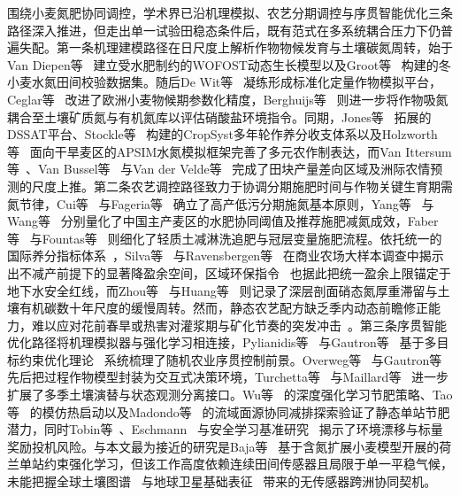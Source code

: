 \documentclass[11pt,a4paper]{article}
\begin{document}
围绕小麦氮肥协同调控，学术界已沿机理模拟、农艺分期调控与序贯智能优化三条路径深入推进，但走出单一试验田稳态条件后，既有范式在多系统耦合压力下仍普遍失配。第一条机理建模路径在日尺度上解析作物物候发育与土壤碳氮周转，始于Van Diepen等~\citep{vandiepen1989} 建立受水肥制约的WOFOST动态生长模型以及Groot等~\citep{groot1991} 构建的冬小麦水氮田间校验数据集。随后De Wit等~\citep{dewit2019} 凝练形成标准化定量作物模拟平台，Ceglar等~\citep{ceglar2019} 改进了欧洲小麦物候期参数化精度，Berghuijs等~\citep{berghuijs2024} 则进一步将作物吸氮耦合至土壤矿质氮与有机氮库以评估硝酸盐环境指令。同期，Jones等~\citep{jones2003} 拓展的DSSAT平台、Stockle等~\citep{stockle2003} 构建的CropSyst多年轮作养分收支体系以及Holzworth等~\citep{holzworth2014} 面向干旱麦区的APSIM水氮模拟框架完善了多元农作制表达，而Van Ittersum等~\citep{vanittersum2013}、Van Bussel等~\citep{vanbussel2015} 与Van der Velde等~\citep{vandervelde2019} 完成了田块产量差向区域及洲际农情预测的尺度上推。第二条农艺调控路径致力于协调分期施肥时间与作物关键生育期需氮节律，Cui等~\citep{cui2010} 与Fageria等~\citep{fageria2005} 确立了高产低污分期施氮基本原则，Yang等~\citep{yang2022} 与Wang等~\citep{wang2020} 分别量化了中国主产麦区的水肥协同阈值及推荐施肥减氮成效，Faber等~\citep{faber2021} 与Fountas等~\citep{fountas2015} 则细化了轻质土减淋洗追肥与冠层变量施肥流程。依托统一的国际养分指标体系~\citep{norton2015}，Silva等~\citep{silva2021} 与Ravensbergen等~\citep{ravensbergen2024} 在商业农场大样本调查中揭示出不减产前提下的显著降盈余空间，区域环保指令~\citep{eu2016,fao2019,klages2020} 也据此把统一盈余上限锚定于地下水安全红线，而Zhou等~\citep{zhou2016} 与Huang等~\citep{huang2007} 则记录了深层剖面硝态氮厚重滞留与土壤有机碳数十年尺度的缓慢周转。然而，静态农艺配方缺乏季内动态前瞻修正能力，难以应对花前春旱或热害对灌浆期与矿化节奏的突发冲击~\citep{altenbach2003,iizumi2016}。第三条序贯智能优化路径将机理模拟器与强化学习相连接，Pylianidis等~\citep{pylianidis2021} 与Gautron等~\citep{gautron2022a} 基于多目标约束优化理论~\citep{censor1977,roijers2013,achiam2017} 系统梳理了随机农业序贯控制前景。Overweg等~\citep{overweg2021} 与Gautron等~\citep{gautron2022b} 先后把过程作物模型封装为交互式决策环境，Turchetta等~\citep{turchetta2022} 与Maillard等~\citep{maillard2023} 进一步扩展了多季土壤演替与状态观测分离接口。Wu等~\citep{wu2022} 的深度强化学习节肥策略、Tao等~\citep{tao2022} 的模仿热启动以及Madondo等~\citep{madondo2023} 的流域面源协同减排探索验证了静态单站节肥潜力，同时Tobin等~\citep{tobin2017}、Eschmann~\citep{eschmann2021} 与安全学习基准研究~\citep{ji2023,sutton2018} 揭示了环境漂移与标量奖励投机风险。与本文最为接近的研究是Baja等~\citep{baja2025} 基于含氮扩展小麦模型开展的荷兰单站约束强化学习，但该工作高度依赖连续田间传感器且局限于单一平稳气候，未能把握全球土壤图谱~\citep{poggio2021} 与地球卫星基础表征~\citep{brown2025,campsvalls2025} 带来的无传感器跨洲协同契机。
\end{document}

